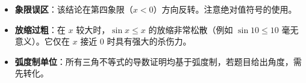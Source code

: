 \begin{trapbox}
\begin{itemize}
    \item \textbf{象限误区}：该结论在第四象限（$x < 0$）方向反转。注意绝对值符号的使用。
    \item \textbf{放缩过粗}：在 $x$ 较大时，$\sin x \leqslant x$ 的放缩非常松散（例如 $\sin 10 \leqslant 10$ 毫无意义）。它仅在 $x$ 接近 $0$ 时具有强大的杀伤力。
    \item \textbf{弧度制单位}：所有三角不等式的导数证明均基于弧度制，若题目给出角度，需先转化。
\end{itemize}
\end{trapbox}